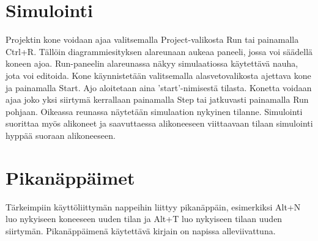 \documentclass[a4paper, 11pt, finnish]{article}
\begin{document}
\section{Simulointi}
Projektin kone voidaan ajaa valitsemalla Project-valikosta Run tai painamalla
Ctrl+R. Tällöin diagrammiesityksen alareunaan aukeaa paneeli, jossa voi
säädellä koneen ajoa. Run-paneelin alareunassa näkyy simulaatiossa käytettävä
nauha, jota voi editoida. Kone käynnistetään valitsemalla alasvetovalikosta
ajettava kone ja painamalla Start. Ajo aloitetaan aina 'start'-nimisestä
tilasta. Konetta voidaan ajaa joko yksi siirtymä
kerrallaan painamalla Step tai jatkuvasti painamalla Run pohjaan. Oikeassa
reunassa näytetään simulaation nykyinen tilanne. Simulointi suorittaa myös
alikoneet ja saavuttaessa alikoneeseen viittaavaan tilaan simulointi hyppää
suoraan alikoneeseen.

\section{Pikanäppäimet}
Tärkeimpiin käyttöliittymän nappeihin liittyy pikanäppäin, esimerkiksi Alt+N
luo nykyiseen koneeseen uuden tilan ja Alt+T luo nykyiseen tilaan uuden
siirtymän. Pikanäppäimenä käytettävä kirjain on napissa alleviivattuna.
\end{document}
